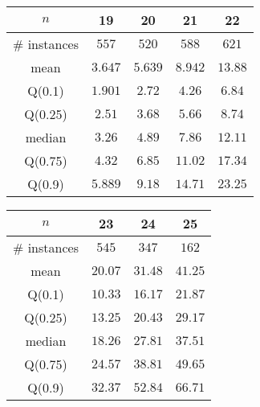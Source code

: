 \begin{tabular}{c|cccc} 
\hline 
$n$ & 19 & 20 & 21 & 22 \tabularnewline 
\hline 
\hline 
\# instances & $557$ & $520$ & $588$ & $621$ \tabularnewline 
mean & $3.647$ & $5.639$ & $8.942$ & $13.88$ \tabularnewline 
Q(0.1) & $1.901$ & $2.72$ & $4.26$ & $6.84$ \tabularnewline 
Q(0.25) & $2.51$ & $3.68$ & $5.66$ & $8.74$ \tabularnewline 
median & $3.26$ & $4.89$ & $7.86$ & $12.11$ \tabularnewline 
Q(0.75) & $4.32$ & $6.85$ & $11.02$ & $17.34$ \tabularnewline 
Q(0.9) & $5.889$ & $9.18$ & $14.71$ & $23.25$ \tabularnewline 
\hline 
\end{tabular} 
\medskip{} 

\begin{tabular}{c|ccc} 
\hline 
$n$ & 23 & 24 & 25 \tabularnewline 
\hline 
\hline 
\# instances & $545$ & $347$ & $162$ \tabularnewline 
mean & $20.07$ & $31.48$ & $41.25$ \tabularnewline 
Q(0.1) & $10.33$ & $16.17$ & $21.87$ \tabularnewline 
Q(0.25) & $13.25$ & $20.43$ & $29.17$ \tabularnewline 
median & $18.26$ & $27.81$ & $37.51$ \tabularnewline 
Q(0.75) & $24.57$ & $38.81$ & $49.65$ \tabularnewline 
Q(0.9) & $32.37$ & $52.84$ & $66.71$ \tabularnewline 
\hline 
\end{tabular} 
\medskip{} 

